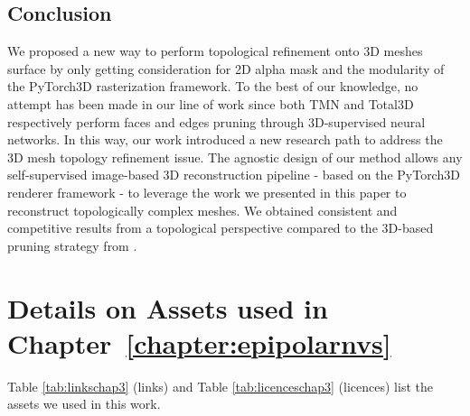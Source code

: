 \subsection{Conclusion}
\label{sec:conclusion}
We proposed a new way to perform topological refinement onto 3D meshes surface by only getting consideration for 2D alpha mask and the modularity of the PyTorch3D rasterization framework. To the best of our knowledge, no attempt has been made in our line of work since both TMN\citep{pan2019deep} and Total3D\citep{nie2020total3dunderstanding} respectively perform faces and edges pruning through 3D-supervised  neural networks. In this way, our work introduced a new research path to address the 3D mesh topology refinement issue. The agnostic design of our method allows any self-supervised image-based 3D reconstruction pipeline - based on the PyTorch3D renderer framework - to leverage the work we presented in this paper to reconstruct topologically complex meshes. We obtained consistent and competitive results from a topological perspective compared to the 3D-based pruning strategy from \citep{pan2019deep}. 








\section{Details on Assets used in Chapter~\ref{chapter:epipolarnvs}}
\label{sec:GradPaint assets}



Table \ref{tab:linkschap3} (links) and Table \ref{tab:licenceschap3} (licences)
list the assets we used in this work.

